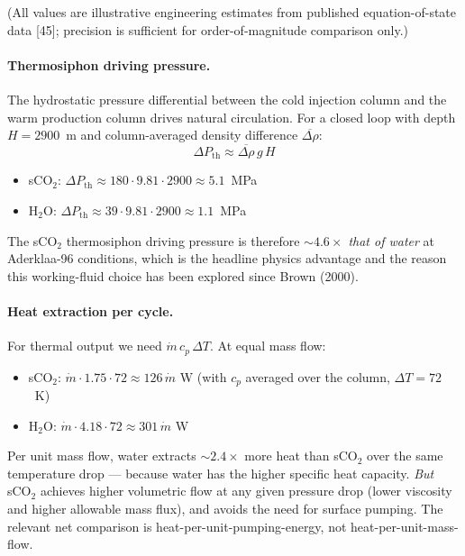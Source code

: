 \documentclass{article}
\begin{document}
(All values are illustrative engineering estimates from
published equation-of-state data [45]; precision is sufficient for
order-of-magnitude comparison only.)

\paragraph{Thermosiphon driving pressure.} The hydrostatic
pressure differential between the cold injection column and the
warm production column drives natural circulation. For a closed
loop with depth $H = 2900$~m and column-averaged density difference
$\overline{\Delta\rho}$:
\[
\Delta P_{\mathrm{th}} \approx \overline{\Delta\rho}\,g\,H
\]
\begin{itemize}
\item sCO$_2$: $\Delta P_{\mathrm{th}} \approx 180 \cdot 9.81
\cdot 2900 \approx 5.1$~MPa
\item H$_2$O: $\Delta P_{\mathrm{th}} \approx 39 \cdot 9.81
\cdot 2900 \approx 1.1$~MPa
\end{itemize}
The sCO$_2$ thermosiphon driving pressure is therefore
\emph{$\sim 4.6\times$ that of water} at Aderklaa-96 conditions,
which is the headline physics advantage and the reason this
working-fluid choice has been explored since Brown (2000).

\paragraph{Heat extraction per cycle.} For thermal output we
need $\dot m\,c_p\,\Delta T$. At equal mass flow:
\begin{itemize}
\item sCO$_2$: $\dot m \cdot 1.75 \cdot 72 \approx 126\,\dot m$
W (with $c_p$ averaged over the column, $\Delta T = 72$~K)
\item H$_2$O: $\dot m \cdot 4.18 \cdot 72 \approx 301\,\dot m$ W
\end{itemize}
Per unit mass flow, water extracts $\sim 2.4\times$ more heat
than sCO$_2$ over the same temperature drop --- because water has
the higher specific heat capacity. \emph{But} sCO$_2$ achieves
higher volumetric flow at any given pressure drop (lower viscosity
and higher allowable mass flux), and avoids the need for surface
pumping. The relevant net comparison is heat-per-unit-pumping-energy,
not heat-per-unit-mass-flow.
\end{document}
